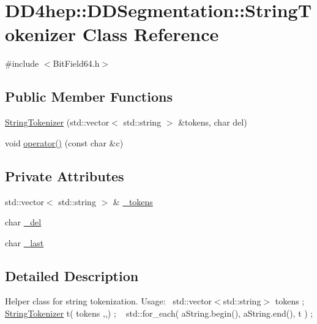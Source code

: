 \hypertarget{class_d_d4hep_1_1_d_d_segmentation_1_1_string_tokenizer}{}\section{D\+D4hep\+:\+:D\+D\+Segmentation\+:\+:String\+Tokenizer Class Reference}
\label{class_d_d4hep_1_1_d_d_segmentation_1_1_string_tokenizer}


{\ttfamily \#include $<$Bit\+Field64.\+h$>$}

\subsection*{Public Member Functions}
\begin{DoxyCompactItemize}
\item 
\hyperlink{class_d_d4hep_1_1_d_d_segmentation_1_1_string_tokenizer_aae9366c4f1ddf75a606c77af83970f8c}{String\+Tokenizer} (std\+::vector$<$ std\+::string $>$ \&tokens, char del)
\item 
void \hyperlink{class_d_d4hep_1_1_d_d_segmentation_1_1_string_tokenizer_a9a7f740ffc721446c786bd7aed987a4b}{operator()} (const char \&c)
\end{DoxyCompactItemize}
\subsection*{Private Attributes}
\begin{DoxyCompactItemize}
\item 
std\+::vector$<$ std\+::string $>$ \& \hyperlink{class_d_d4hep_1_1_d_d_segmentation_1_1_string_tokenizer_aac884d4330a88a11e4460ea9240cdb85}{\+\_\+tokens}
\item 
char \hyperlink{class_d_d4hep_1_1_d_d_segmentation_1_1_string_tokenizer_a0d18dc607eefcdae2de3f5b01d8294f5}{\+\_\+del}
\item 
char \hyperlink{class_d_d4hep_1_1_d_d_segmentation_1_1_string_tokenizer_a3865b5d3ed0d300132963b9f214028e0}{\+\_\+last}
\end{DoxyCompactItemize}


\subsection{Detailed Description}
Helper class for string tokenization. Usage\+:~\newline
 std\+::vector$<$std\+::string$>$ tokens ; ~\newline
 \hyperlink{class_d_d4hep_1_1_d_d_segmentation_1_1_string_tokenizer}{String\+Tokenizer} t( tokens ,\textquotesingle{},\textquotesingle{}) ; ~\newline
 std\+::for\+\_\+each( a\+String.\+begin(), a\+String.\+end(), t ) ; ~\newline


